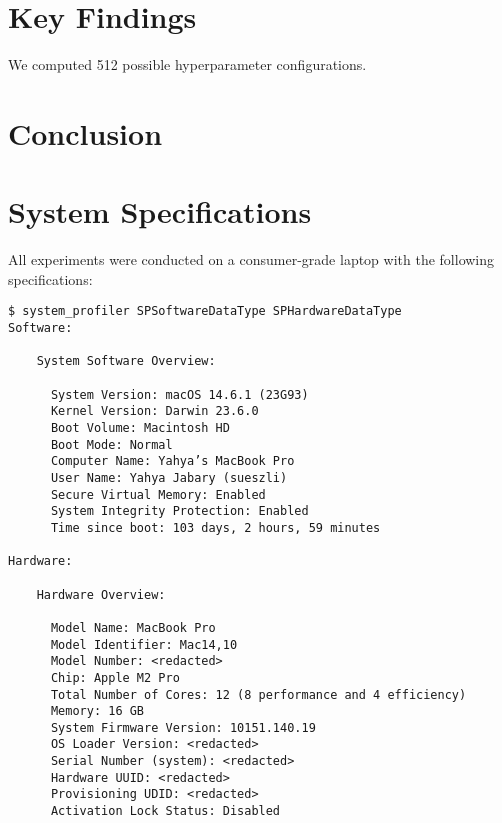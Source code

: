 \documentclass[manuscript]{acmart}
\begin{document}
\section{Key Findings}


We computed 512 possible hyperparameter configurations.

\section{Conclusion}









\appendix

\section{System Specifications}

All experiments were conducted on a consumer-grade laptop with the following specifications:

\begin{footnotesize}
\begin{verbatim}
$ system_profiler SPSoftwareDataType SPHardwareDataType
Software:

    System Software Overview:

      System Version: macOS 14.6.1 (23G93)
      Kernel Version: Darwin 23.6.0
      Boot Volume: Macintosh HD
      Boot Mode: Normal
      Computer Name: Yahya’s MacBook Pro
      User Name: Yahya Jabary (sueszli)
      Secure Virtual Memory: Enabled
      System Integrity Protection: Enabled
      Time since boot: 103 days, 2 hours, 59 minutes

Hardware:

    Hardware Overview:

      Model Name: MacBook Pro
      Model Identifier: Mac14,10
      Model Number: <redacted>
      Chip: Apple M2 Pro
      Total Number of Cores: 12 (8 performance and 4 efficiency)
      Memory: 16 GB
      System Firmware Version: 10151.140.19
      OS Loader Version: <redacted>
      Serial Number (system): <redacted>
      Hardware UUID: <redacted>
      Provisioning UDID: <redacted>
      Activation Lock Status: Disabled
\end{verbatim}
\end{footnotesize}
\end{document}
